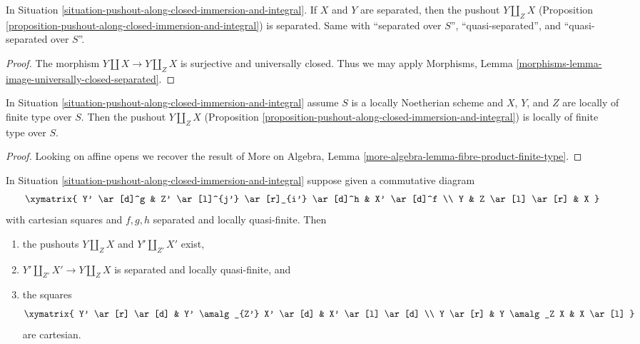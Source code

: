 \begin{lemma}
\label{lemma-pushout-separated}
In Situation \ref{situation-pushout-along-closed-immersion-and-integral}.
If $X$ and $Y$ are separated, then the pushout $Y \amalg_Z X$
(Proposition \ref{proposition-pushout-along-closed-immersion-and-integral})
is separated. Same with ``separated over $S$'', ``quasi-separated'', and
``quasi-separated over $S$''.
\end{lemma}

\begin{proof}
The morphism $Y \amalg X \to Y \amalg_Z X$ is surjective
and universally closed. Thus we may apply
Morphisms, Lemma \ref{morphisms-lemma-image-universally-closed-separated}.
\end{proof}

\begin{lemma}
\label{lemma-pushout-finite-type}
In Situation \ref{situation-pushout-along-closed-immersion-and-integral}
assume $S$ is a locally Noetherian scheme and $X$, $Y$, and $Z$
are locally of finite type over $S$. Then the pushout $Y \amalg_Z X$
(Proposition \ref{proposition-pushout-along-closed-immersion-and-integral})
is locally of finite type over $S$.
\end{lemma}

\begin{proof}
Looking on affine opens we recover the result of
More on Algebra, Lemma \ref{more-algebra-lemma-fibre-product-finite-type}.
\end{proof}

\begin{lemma}
\label{lemma-pushout-functor}
In Situation \ref{situation-pushout-along-closed-immersion-and-integral}
suppose given a commutative diagram
$$
\xymatrix{
Y' \ar[d]^g & Z' \ar[l]^{j'} \ar[r]_{i'} \ar[d]^h & X' \ar[d]^f \\
Y & Z \ar[l] \ar[r] & X
}
$$
with cartesian squares and $f, g, h$ separated and locally quasi-finite. Then
\begin{enumerate}
\item the pushouts $Y \amalg_Z X$ and $Y' \amalg_{Z'} X'$ exist,
\item $Y' \amalg_{Z'} X' \to Y \amalg_Z X$ is
separated and locally quasi-finite, and
\item the squares
$$
\xymatrix{
Y' \ar[r] \ar[d] & Y' \amalg_{Z'} X' \ar[d] & X' \ar[l] \ar[d] \\
Y \ar[r] & Y \amalg_Z X & X \ar[l]
}
$$
are cartesian.
\end{enumerate}
\end{lemma}

